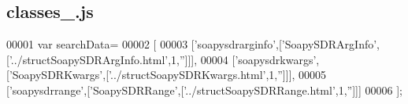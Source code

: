 \subsection{classes\+\_.\+js}
\label{classes__4_8js_source}

\begin{DoxyCode}
00001 var searchData=
00002 [
00003   [\textcolor{stringliteral}{'soapysdrarginfo'},[\textcolor{stringliteral}{'SoapySDRArgInfo'},[\textcolor{stringliteral}{'../structSoapySDRArgInfo.html'},1,\textcolor{stringliteral}{''}]]],
00004   [\textcolor{stringliteral}{'soapysdrkwargs'},[\textcolor{stringliteral}{'SoapySDRKwargs'},[\textcolor{stringliteral}{'../structSoapySDRKwargs.html'},1,\textcolor{stringliteral}{''}]]],
00005   [\textcolor{stringliteral}{'soapysdrrange'},[\textcolor{stringliteral}{'SoapySDRRange'},[\textcolor{stringliteral}{'../structSoapySDRRange.html'},1,\textcolor{stringliteral}{''}]]]
00006 ];
\end{DoxyCode}
